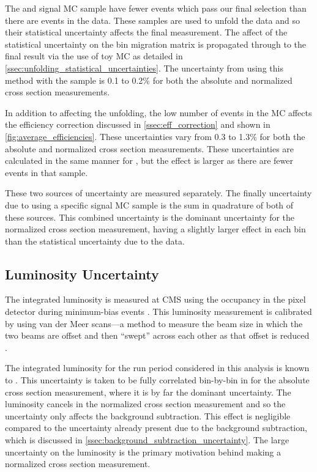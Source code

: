 The \MADGRAPH and \POWHEG signal MC sample have fewer events which pass our
final selection than there are events in the data. These samples are used to
unfold the data and so their statistical uncertainty affects the final
measurement. The affect of the statistical uncertainty on the bin migration
matrix is propagated through to the final result via the use of toy MC as
detailed in \cref{ssec:unfolding_statistical_uncertainties}. The
uncertainty from using this method with the \MADGRAPH sample is 0.1 to 0.2\%
for both the absolute and normalized cross section measurements.

In addition to affecting the unfolding, the low number of events in the MC
affects the efficiency correction discussed in \cref{ssec:eff_correction}
and shown in \cref{fig:average_efficiencies}. These uncertainties vary from
0.3 to 1.3\% for both the absolute and normalized cross section measurements.
These uncertainties are calculated in the same manner for \POWHEG, but the
effect is larger as there are fewer events in that sample.

These two sources of uncertainty are measured separately. The finally
uncertainty due to using a specific signal MC sample is the sum in quadrature
of both of these sources. This combined uncertainty is the dominant uncertainty
for the normalized cross section measurement, having a slightly larger effect
in each \phistar bin than the statistical uncertainty due to the data.

\subsection{Luminosity Uncertainty}
\label{ssec:lumi_uncertainty}

The integrated luminosity is measured at CMS using the occupancy in the pixel
detector during minimum-bias events \cite{cms_lumi_2013}. This luminosity
measurement is calibrated by using van der Meer scans---a method to measure the
beam size in which the two beams are offset and then ``swept'' across each
other as that offset is reduced \cite{vandermeer_1968}.

The integrated luminosity for the run period considered in this analysis is
known to \LumiUncertainty. This uncertainty is taken to be fully correlated
bin-by-bin in \phistar for the absolute cross section measurement, where it is
by far the dominant uncertainty. The luminosity cancels in the normalized
cross section measurement and so the uncertainty only affects the background
subtraction. This effect is negligible compared to the uncertainty already
present due to the background subtraction, which is discussed in
\cref{ssec:background_subtraction_uncertainty}. The large uncertainty on
the luminosity is the primary motivation behind making a normalized cross
section measurement.


